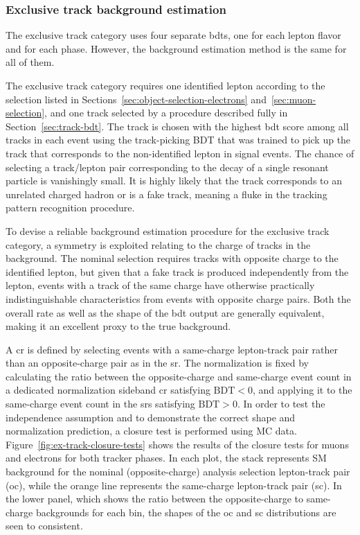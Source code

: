 \clearpage
\subsubsection{Exclusive track background estimation}
\label{sec:ex-track-background-estimation}

The exclusive track category uses four separate \glspl{bdt}, one for each lepton flavor and for each phase. However, the background estimation method is the same for all of them.

The exclusive track category requires one identified lepton according to the selection listed in Sections~\ref{sec:object-selection-electrons} and~\ref{sec:muon-selection}, and one track selected by a procedure described fully in Section~\ref{sec:track-bdt}. The track is chosen with the highest \gls{bdt} score among all tracks in each event using the track-picking BDT that was trained to pick up the track that corresponds to the non-identified lepton in signal events. The chance of selecting a track/lepton pair corresponding to the decay of a single resonant particle is vanishingly small. It is highly likely that the track corresponds to an unrelated charged hadron or is a fake track, meaning a fluke in the tracking pattern recognition procedure.

To devise a reliable background estimation procedure for the exclusive track category, a symmetry is exploited relating to the charge of tracks in the background. The nominal selection requires tracks with opposite charge to the identified lepton, but given that a fake track is produced independently from the lepton, events with a track of the same charge have otherwise practically indistinguishable characteristics from events with opposite charge pairs. Both the overall rate as well as the shape of the \gls{bdt} output are generally equivalent, making it an excellent proxy to the true background.

A \gls{cr} is defined by selecting events with a same-charge lepton-track pair rather than an opposite-charge pair as in the \gls{sr}. The normalization is fixed by calculating the ratio between the opposite-charge and same-charge event count in a dedicated normalization sideband \gls{cr} satisfying $\text{BDT} < 0$, and applying it to the same-charge event count in the \glspl{sr} satisfying $\text{BDT} > 0$. In order to test the independence assumption and to demonstrate the correct shape and normalization prediction, a closure test is performed using MC data. Figure~\ref{fig:ex-track-closure-tests} shows the results of the closure tests for muons and electrons for both tracker phases. In each plot, the stack represents SM background for the nominal (opposite-charge) analysis selection lepton-track pair (oc), while the orange line represents the same-charge lepton-track pair (sc). In the lower panel, which shows the ratio between the opposite-charge to same-charge backgrounds for each bin, the shapes of the oc and sc distributions are seen to consistent.

